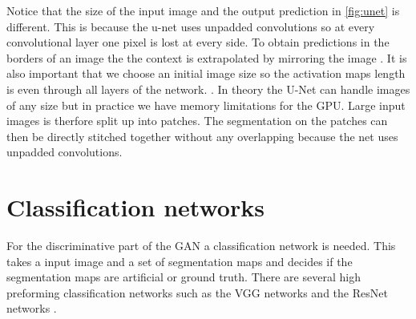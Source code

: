 \documentclass{kththesis}
\begin{document}
Notice that the size of the input image and the output prediction in \ref{fig:unet} is different. This is because the u-net uses unpadded convolutions so at every convolutional layer one pixel is lost at every side. To obtain predictions in the borders of an image the the context is extrapolated by mirroring the image \parencite{li_deepunet:_2017}. It is also important that we choose an initial image size so the activation maps length is even through all layers of the network. \parencite{ronneberger_u-net:_2015}. In theory the U-Net can handle images of any size but in practice we have memory limitations for the GPU. Large input images is therfore split up into patches. The segmentation on the patches can then be directly stitched together without any overlapping because the net uses unpadded convolutions.
\section{Classification networks}
For the discriminative part of the GAN a classification network is needed. This takes a input image and a set of segmentation maps and decides if the segmentation maps are artificial or ground truth. There are several high preforming classification networks such as the VGG networks \parencite{simonyan_very_2014} and the ResNet networks \parencite{he_deep_2015}.
\end{document}
